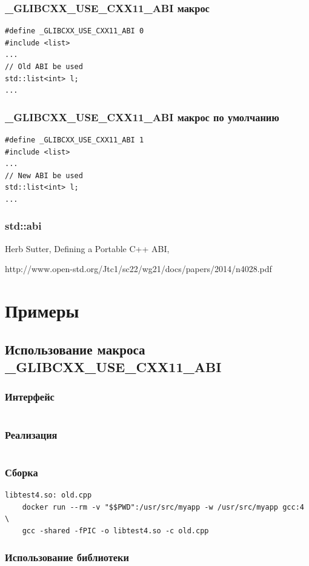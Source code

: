 \documentclass{beamer}
\begin{document}
\begin{frame}[fragile]
\frametitle{\_GLIBCXX\_USE\_CXX11\_ABI макрос}
\begin{verbatim}
#define _GLIBCXX_USE_CXX11_ABI 0
#include <list>
...
// Old ABI be used
std::list<int> l;
...
\end{verbatim} 
\end{frame}

\begin{frame}[fragile]
\frametitle{\_GLIBCXX\_USE\_CXX11\_ABI макрос по умолчанию}
\begin{verbatim}
#define _GLIBCXX_USE_CXX11_ABI 1
#include <list>
...
// New ABI be used
std::list<int> l;
...
\end{verbatim} 
\end{frame}

\begin{frame}[fragile]
\frametitle{std::abi}
 Herb Sutter, Defining a Portable C++ ABI,

 http://www.open-std.org/Jtc1/sc22/wg21/docs/papers/2014/n4028.pdf
\end{frame}

\section{Примеры}

\subsection{Использование макроса \_GLIBCXX\_USE\_CXX11\_ABI}

\begin{frame}[fragile]
\frametitle{Интерфейс}
\inputminted{c++}{../src/old.h}
\end{frame}

\begin{frame}[fragile]
\frametitle{Реализация}
\inputminted{c++}{../src/old.cpp}
\end{frame}

\begin{frame}[fragile]
\frametitle{Сборка}
\begin{verbatim}
libtest4.so: old.cpp
	docker run --rm -v "$$PWD":/usr/src/myapp -w /usr/src/myapp gcc:4 \
	gcc -shared -fPIC -o libtest4.so -c old.cpp
\end{verbatim}
\end{frame}

\begin{frame}[fragile]
\frametitle{Использование библиотеки}
\inputminted{c++}{../src/main.cpp}
\end{frame}
\end{document}
